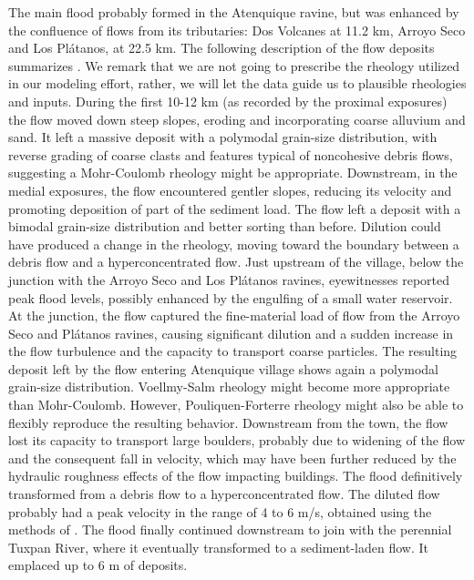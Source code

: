 \documentclass[nhess, manuscript]{copernicus}
\begin{document}
The main flood probably formed in the Atenquique ravine, but was enhanced by the confluence of flows from its tributaries: Dos Volcanes at 11.2 km, Arroyo Seco and Los Pl\'atanos, at 22.5 km. The following description of the flow deposits summarizes \cite{Saucedo2008}. We remark that we are not going to prescribe the rheology utilized in our modeling effort, rather, we will let the data guide us to plausible rheologies and inputs. During the first 10-12 km (as recorded by the proximal exposures) the flow moved down steep slopes, eroding and incorporating coarse alluvium and sand. It left a massive deposit with a polymodal grain-size distribution, with reverse grading of coarse clasts and features typical of noncohesive debris flows, suggesting a Mohr-Coulomb rheology might be appropriate. Downstream, in the medial exposures, the flow encountered gentler slopes, reducing its velocity and promoting deposition of part of the sediment load. The flow left a deposit with a bimodal grain-size distribution and better sorting than before. Dilution could have produced a change in the rheology, moving toward the boundary between a debris flow and a hyperconcentrated flow. Just upstream of the village, below the junction with the Arroyo Seco and Los Pl\'atanos ravines, eyewitnesses reported peak flood levels, possibly enhanced by the engulfing of a small water reservoir. At the junction, the flow captured the fine-material load of flow from the Arroyo Seco and Pl\'atanos ravines, causing significant dilution and a sudden increase in the flow turbulence and the capacity to transport coarse particles. The resulting deposit left by the flow entering Atenquique village shows again a polymodal grain-size distribution. Voellmy-Salm rheology might become more appropriate than Mohr-Coulomb. However, Pouliquen-Forterre rheology might also be able to flexibly reproduce the resulting behavior. Downstream from the town, the flow lost its capacity to transport large boulders, probably due to widening of the flow and the consequent fall in velocity, which may have been further reduced by the hydraulic roughness effects of the flow impacting buildings. The flood definitively transformed from a debris flow to a hyperconcentrated flow. The diluted flow probably had a peak velocity in the range of 4 to 6 m/s, obtained using the methods of \cite{Pierson1985}. The flood finally continued downstream to join with the perennial Tuxpan River, where it eventually transformed to a sediment-laden flow. It emplaced up to 6 m of deposits.
\end{document}
